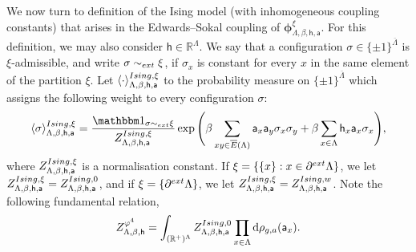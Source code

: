 \documentclass[11pt,a4paper]{article}
\theoremstyle{definition}
\numberwithin{equation}{section}
\begin{document}
 We now turn to definition of the Ising model (with inhomogeneous coupling constants) that arises in the Edwards--Sokal coupling of $\boldsymbol \phi^\xi_{\Lambda,\beta,\mathsf h, \mathsf a}$. For this definition, we may also consider $\mathsf{h}\in \mathbb R^\Lambda$. We say that a configuration $\sigma \in \{\pm 1\}^{\overline \Lambda}$ is $\xi$-admissible, and write $\sigma \sim_{\rm ext} \xi$, if $\sigma_x$ is constant for every $x$ in the same element of the partition $\xi$. Let $\langle \cdot \rangle^{{\rm Ising}, \xi}_{\Lambda,\beta,\mathsf h, \mathsf a}$ to the probability measure on $\{\pm 1\}^{\overline \Lambda}$ which assigns the following weight to every configuration $\sigma$:
\begin{equation}\label{eq:Ising_def}
\langle \sigma \rangle^{\textup{Ising},\xi}_{\Lambda,\beta,\mathsf h, \mathsf{a}}=\frac{ \mathbbm 1_{\sigma\sim_{\rm ext}\xi}
}{Z^{\textup{Ising},\xi}_{\Lambda,\beta,\mathsf h, \mathsf{a}}} \exp\Bigg( \beta\sum_{xy\in \overline{E}(\Lambda)}  \mathsf a_x \mathsf{a}_y \sigma_x \sigma_y + \beta\sum_{x\in \Lambda} \mathsf{h}_x  \mathsf{a}_x \sigma_x \Bigg),
\end{equation}
where $Z^{\textup{Ising},\xi}_{\Lambda,\beta,\mathsf h, \mathsf{a}}$ is a normalisation constant. If $\xi=\{\{x\}: x\in \partial^{\rm ext}\Lambda\}$, we let $Z^{\textup{Ising},\xi}_{\Lambda,\beta,\mathsf h, \mathsf{a}}=Z^{\textup{Ising},0}_{\Lambda,\beta,\mathsf h, \mathsf{a}}$, and if $\xi=\{\partial^{\rm ext}\Lambda\}$, we let $Z^{\textup{Ising},\xi}_{\Lambda,\beta,\mathsf h, \mathsf{a}}=Z^{\textup{Ising},w}_{\Lambda,\beta,\mathsf h, \mathsf{a}}$. Note the following fundamental relation,
\begin{equation}\label{eq: relation phi4 Ising partition functions}
    Z^{\varphi^4}_{\Lambda,\beta,\mathsf{h}}=\int_{(\mathbb R^+)^\Lambda}Z^{\rm Ising, 0}_{\Lambda,\beta,\mathsf{h},\mathsf{a}}\prod_{x\in \Lambda}\mathrm{d}\rho_{g,a}(\mathsf{a}_x).
\end{equation}
\end{document}

